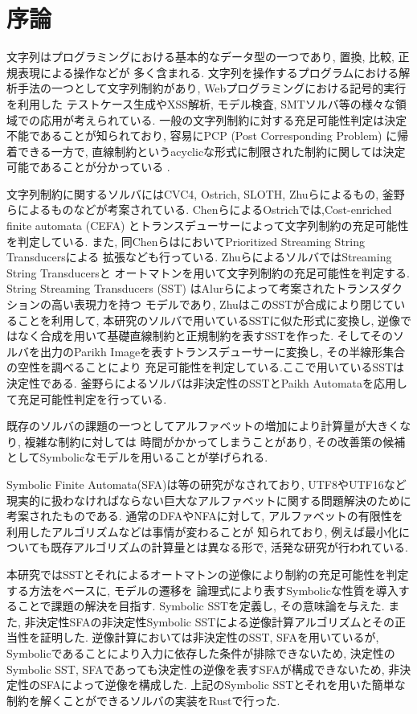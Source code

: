 \documentclass[uplatex,dvipdfmx,a4j]{jsreport}
\begin{document}
  \chapter{序論}  \label{chap:introduction}

  文字列はプログラミングにおける基本的なデータ型の一つであり, 置換, 比較, 正規表現による操作などが
  多く含まれる.
  文字列を操作するプログラムにおける解析手法の一つとして文字列制約があり, Webプログラミングにおける記号的実行を利用した
  テストケース生成やXSS解析, モデル検査, SMTソルバ等の様々な領域での応用が考えられている.
  一般の文字列制約に対する充足可能性判定は決定不能であることが知られており, 容易にPCP (Post Corresponding Problem)
  に帰着できる一方で, 直線制約というacyclicな形式に制限された制約に関しては決定可能であることが分かっている
  \cite{lin2016string}.

  文字列制約に関するソルバにはCVC4\cite{barrett2011cvc4},
  Ostrich\cite{chen2020decision}, SLOTH\cite{holik2017string}, Zhuらによるもの\cite{zhu2019sstsolver},
  釜野らによるもの\cite{kamano2021solver}などが考案されている.
  ChenらによるOstrichでは,Cost-enriched finite automata (CEFA)\cite{alur2013regular}
  とトランスデューサーによって文字列制約の充足可能性を判定している.
  また, 同Chenらは\cite{chen2022solving}においてPrioritized Streaming String Transducersによる
  拡張なども行っている.
  ZhuらによるソルバではStreaming String Transducersと
  オートマトンを用いて文字列制約の充足可能性を判定する.
  String Streaming Transducers (SST) \cite{alur2011streaming}
  はAlurらによって考案されたトランスダクションの高い表現力を持つ
  モデルであり, ZhuはこのSSTが合成により閉じていることを利用して,
  本研究のソルバで用いているSSTに似た形式に変換し, 逆像ではなく合成を用いて基礎直線制約と正規制約を表すSSTを作った.
  そしてそのソルバを出力のParikh Imageを表すトランスデューサーに変換し, その半線形集合の空性を調べることにより
  充足可能性を判定している.ここで用いているSSTは決定性である.
  釜野らによるソルバは非決定性のSSTとPaikh Automata\cite{cadilhac2012affine}を応用して充足可能性判定を行っている.

  既存のソルバの課題の一つとしてアルファベットの増加により計算量が大きくなり, 複雑な制約に対しては
  時間がかかってしまうことがあり, その改善策の候補としてSymbolicなモデルを用いることが挙げられる.

  Symbolic Finite Automata(SFA)は\cite{d2017power}等の研究がなされており,
  UTF8やUTF16など現実的に扱わなければならない巨大なアルファベットに関する問題解決のために考案されたものである.
  通常のDFAやNFAに対して, アルファベットの有限性を利用したアルゴリズムなどは事情が変わることが
  知られており, 例えば最小化についても既存アルゴリズムの計算量とは異なる形で, 活発な研究が行われている.

  本研究ではSSTとそれによるオートマトンの逆像により制約の充足可能性を判定する方法をベースに, モデルの遷移を
  論理式により表すSymbolicな性質を導入することで課題の解決を目指す.
  Symbolic SSTを定義し, その意味論を与えた.
  また, 非決定性SFAの非決定性Symbolic SSTによる逆像計算アルゴリズムとその正当性を証明した.
  逆像計算においては非決定性のSST, SFAを用いているが, Symbolicであることにより入力に依存した条件が排除できないため,
  決定性のSymbolic SST, SFAであっても決定性の逆像を表すSFAが構成できないため, 非決定性のSFAによって逆像を構成した.
  上記のSymbolic SSTとそれを用いた簡単な制約を解くことができるソルバの実装をRustで行った.
\end{document}
